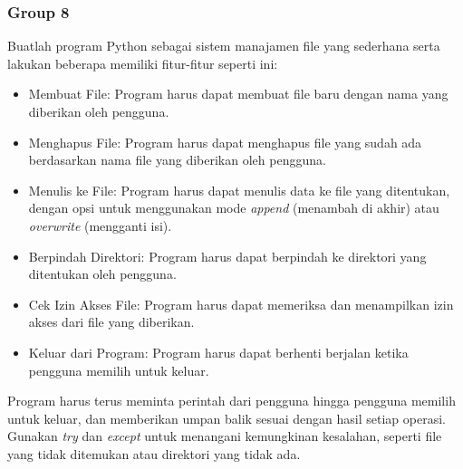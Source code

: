 \documentclass[12pt]{article}
\begin{document}
\subsubsection{Group 8}
Buatlah program Python sebagai sistem manajamen file yang sederhana serta lakukan beberapa memiliki fitur-fitur seperti ini:
\begin{itemize}
    \item Membuat File: Program harus dapat membuat file baru dengan nama yang diberikan oleh pengguna.
    \item Menghapus File: Program harus dapat menghapus file yang sudah ada berdasarkan nama file yang diberikan oleh pengguna.
    \item Menulis ke File: Program harus dapat menulis data ke file yang ditentukan, dengan opsi untuk menggunakan mode
    \textit{append} (menambah di akhir) atau \textit{overwrite} (mengganti isi).
    \item Berpindah Direktori: Program harus dapat berpindah ke direktori yang ditentukan oleh pengguna.
    \item Cek Izin Akses File: Program harus dapat memeriksa dan menampilkan izin akses dari file yang diberikan.
    \item Keluar dari Program: Program harus dapat berhenti berjalan ketika pengguna memilih untuk keluar.
\end{itemize}
Program harus terus meminta perintah dari pengguna hingga pengguna memilih untuk keluar, dan memberikan umpan balik sesuai dengan hasil setiap operasi. Gunakan \textit{try} dan \textit{except} untuk menangani kemungkinan kesalahan, seperti file yang tidak ditemukan atau direktori yang tidak ada.
\end{document}
